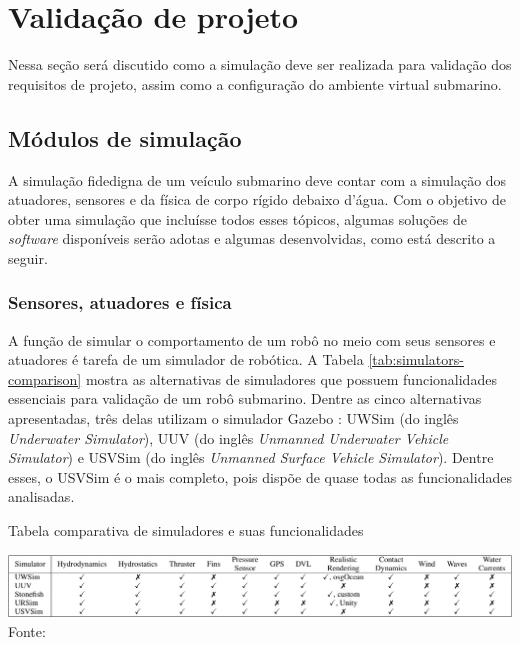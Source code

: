 \section{Validação de projeto}
\label{sec:validacao}

Nessa seção será discutido como a simulação deve ser
realizada para validação dos requisitos de projeto, assim como a configuração do
ambiente virtual submarino.

\subsection{Módulos de simulação}
\label{sec:simu-modules}

A simulação fidedigna de um veículo submarino deve contar com a simulação dos
atuadores, sensores e da física de corpo rígido debaixo d'água. Com o objetivo de obter uma simulação que incluísse todos esses tópicos, algumas soluções de \textit{software} disponíveis serão adotas e algumas desenvolvidas, como está descrito a seguir.

\subsubsection*{Sensores, atuadores e física}

A função de simular o comportamento de um robô no meio com seus sensores e
atuadores é tarefa de um simulador de robótica. A Tabela \ref{tab:simulators-comparison} mostra as alternativas de simuladores
que possuem funcionalidades essenciais para validação de um robô submarino.
Dentre as cinco alternativas apresentadas, três delas utilizam o simulador Gazebo \cite{gazebo}: UWSim (do inglês {\it Underwater Simulator}), UUV
(do inglês {\it Unmanned Underwater Vehicle Simulator}) e USVSim (do inglês {\it Unmanned Surface
Vehicle Simulator}). Dentre esses, o USVSim é o mais completo, pois dispõe
de quase todas as funcionalidades analisadas.

\begin{table}[h]
    \label{tab:simulators-comparison}
    \caption{Tabela comparativa de simuladores e suas funcionalidades}
    \centering
    \includegraphics[width=1\textwidth]{images/simulators_comparison.png}\\
    \footnotesize Fonte: \cite{simulators-comparison}
\end{table}

